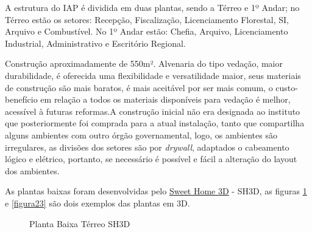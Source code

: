 \documentclass[	DIV=calc,%
							paper=a4,%
							fontsize=12pt,%
							onecolumn]{scrartcl}	 					%
\begin{document}
A estrutura do IAP é dividida em duas plantas, sendo a Térreo e 1º Andar; no Térreo estão os setores: Recepção, Fiscalização, Licenciamento Florestal, SI, Arquivo e Combustível. No 1º Andar estão: Chefia, Arquivo, Licenciamento Industrial, Administrativo e Escritório Regional.\par
Construção aproximadamente de 550m². Alvenaria do tipo vedação, maior durabilidade, é oferecida uma flexibilidade e versatilidade maior, seus materiais de construção são mais baratos, é mais aceitável por ser mais comum, o custo-benefício em relação a todos os materiais disponíveis para vedação é melhor, acessível à futuras reformas.A construção inicial não era designada ao instituto que posteriormente foi comprada para a atual instalação, tanto que compartilha alguns ambientes com outro órgão governamental, logo, os ambientes são irregulares, as divisões dos setores são por \textit{drywall}, adaptados o cabeamento lógico e elétrico, portanto, se necessário é possível e fácil a alteração do layout dos ambientes.\par
As plantas baixas foram desenvolvidas pelo \href{http://www.sweethome3d.com/pt/}{Sweet Home 3D} - SH3D, as figuras \ref{figura22} e \ref{figura23} são dois exemplos das plantas em 3D.

\clearpage
\clearpage 
\thispagestyle{plain}
\recalctypearea
\begin{figure}
	\noindent{}
	\caption[Planta Baixa Térreo SH3D]{Planta Baixa Térreo SH3D}
	\label{figura22}
\end{figure}

\end{document}
